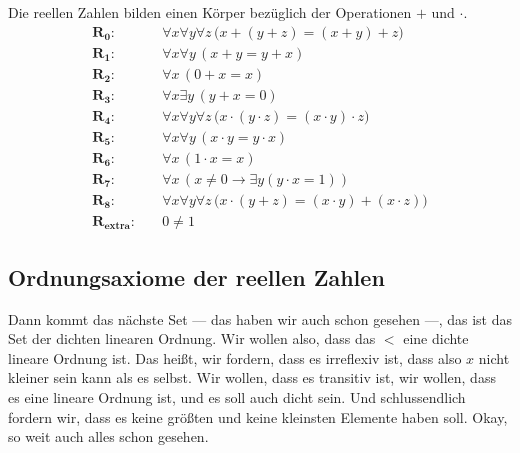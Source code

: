 \begin{math-stroke}
Die reellen Zahlen bilden einen Körper bezüglich der Operationen $+$ und $\cdot$.
\begin{align}
    \mathbf{R_0}\colon &\quad \forall x \forall y \forall z \, \bigl(x + (y + z) = (x + y) + z\bigr) \label{eq:R0} \\
    \mathbf{R_1}\colon &\quad \forall x \forall y \, (x + y = y + x) \label{eq:R1} \\
    \mathbf{R_2}\colon &\quad \forall x \, (0 + x = x) \label{eq:R2} \\
    \mathbf{R_3}\colon &\quad \forall x \exists y \, (y + x = 0) \label{eq:R3} \\
    \mathbf{R_4}\colon &\quad \forall x \forall y \forall z \, \bigl(x \cdot (y \cdot z) = (x \cdot y) \cdot z\bigr) \label{eq:R4} \\
    \mathbf{R_5}\colon &\quad \forall x \forall y \, (x \cdot y = y \cdot x) \label{eq:R5} \\
    \mathbf{R_6}\colon &\quad \forall x \, (1 \cdot x = x) \label{eq:R6} \\
    \mathbf{R_7}\colon &\quad \forall x \, (x \neq 0 \to \exists y (y \cdot x = 1)) \label{eq:R7} \\
    \mathbf{R_8}\colon &\quad \forall x \forall y \forall z \, \bigl(x \cdot (y + z) = (x \cdot y) + (x \cdot z)\bigr) \label{eq:R8} \\
    \mathbf{R_{\text{extra}}}\colon &\quad 0 \neq 1 \nonumber
\end{align}
\end{math-stroke}

\subsection{Ordnungsaxiome der reellen Zahlen}
\begin{spoken-clean}[00:15:56 - 00:18:20]
Dann kommt das nächste Set --- das haben wir auch schon gesehen ---, das ist das Set der dichten linearen Ordnung. Wir wollen also, dass das $<$ eine dichte lineare Ordnung ist. Das heißt, wir fordern, dass es irreflexiv ist, dass also $x$ nicht kleiner sein kann als es selbst. Wir wollen, dass es transitiv ist, wir wollen, dass es eine lineare Ordnung ist, und es soll auch dicht sein. Und schlussendlich fordern wir, dass es keine größten und keine kleinsten Elemente haben soll. Okay, so weit auch alles schon gesehen.
\end{spoken-clean}

